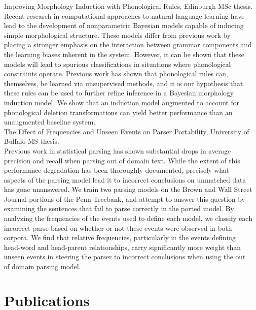 \documentclass[11pt, a4paper]{article}
\begin{document}
Improving Morphology Induction with Phonological Rules, Edinburgh MSc thesis.\\

Recent research in computational approaches to natural language learning have lead to the development of nonparametric Bayesian models capable of inducing simple morphological structure.  These models differ from previous work by placing a stronger emphasis on the interaction between grammar components and the learning biases inherent in the system.  However, it can be shown that these models will lead to spurious classifications in situations where phonological constraints operate.  Previous work has shown that phonological rules can, themselves, be learned via unsupervised methods, and it is our hypothesis that these rules can be used to further refine inference in a Bayesian morphology induction model.  We show that an induction model augmented to account for phonological deletion transformations can yield better performance than an unaugmented baseline system.\\

The Effect of Frequencies and Unseen Events on Parser Portability, University of Buffalo MS thesis.\\

Previous work in statistical parsing has shown substantial drops in average precision and recall when parsing out of domain text.  While the extent of this performance degradation has been thoroughly documented, precisely what aspects of the parsing model lead it to incorrect conclusions on unmatched data has gone unanswered.  We train two parsing models on the Brown and Wall Street Journal portions of the Penn Treebank, and attempt to answer this question by examining the sentences that fail to parse correctly in the ported model.  By analyzing the frequencies of the events used to define each model, we classify each incorrect parse based on whether or not these events were observed in both corpora.  We find that relative frequencies, particularly in the events defining head-word and head-parent relationships, carry significantly more weight than unseen events in steering the parser to incorrect conclusions when using the out of domain parsing model.\\


\section*{Publications}
 
\end{document}
